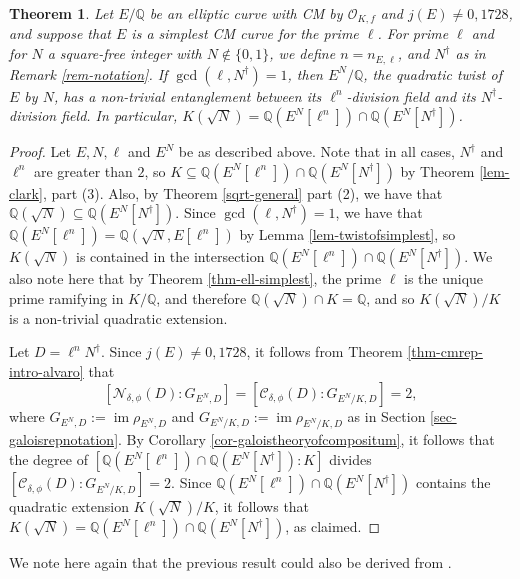 \documentclass[11pt]{amsart}
\newtheorem{theorem}[defn]{Theorem}
\theoremstyle{definition}
\newcommand{\Q}{\mathbb{Q}}
\newcommand{\Of}{\mathcal{O}_{K,f}}
\DeclareMathOperator{\im}{im}  %
\begin{document}
\begin{theorem}
\label{thm-entanglement}
Let $E/\Q$ be an elliptic curve with CM by $\Of$ and $j(E) \neq 0, 1728$, and suppose that $E$ is a simplest CM curve for the prime $\ell$. For prime $\ell$ and for $N$ a square-free integer with $N \notin \{0, 1 \}$, we define $n=n_{E,\ell}$, and $N^{\dagger}$ as in Remark \ref{rem-notation}.
If $\gcd(\ell, N^\dagger) = 1$, then $E^{N}/\Q$, the quadratic twist of $E$ by $N$, has a non-trivial entanglement between its $\ell^n$-division field and its $N^\dagger$-division field. In particular, $K(\sqrt{N}) = \Q(E^{N}[\ell^n]) \cap \Q(E^{N}[N^\dagger])$.

\end{theorem}

\begin{proof}

Let $E, N, \ell$ and $E^N$ be as described above. Note that in all cases, $N^\dagger$ and $\ell^n$ are greater than $2$, so $K \subseteq \Q(E^{N}[\ell^n]) \cap \Q(E^{N}[N^\dagger])$ by Theorem \ref{lem-clark}, part (3). Also, by Theorem \ref{sqrt-general} part (2), we have that $\Q(\sqrt{N}) \subseteq \Q(E^N[N^\dagger])$. Since $\gcd(\ell, N^\dagger) = 1$, we have that $\Q(E^N[\ell^n]) = \Q(\sqrt{N}, E[\ell^n])$ by Lemma \ref{lem-twistofsimplest}, so $K(\sqrt{N})$ is contained in the intersection $\Q(E^{N}[\ell^n]) \cap \Q(E^{N}[N^\dagger])$. We also note here that by Theorem \ref{thm-ell-simplest}, the prime $\ell$ is the unique prime ramifying in $K/\Q$, and therefore $\Q(\sqrt{N})\cap K=\Q$, and so $K(\sqrt{N})/K$ is a non-trivial quadratic extension.

Let $D=\ell^n N^\dagger$. Since $j(E) \neq 0, 1728$, it follows from Theorem \ref{thm-cmrep-intro-alvaro} that \[ [\mathcal{N}_{\delta, \phi}(D) : G_{E^N, D}] = [\mathcal{C}_{\delta, \phi}(D) : G_{E^N/K, D}] = 2,\] where $G_{E^N, D} := \im \rho_{E^N, D}$ and $G_{E^N/K, D} := \im \rho_{E^N/K, D}$ as in Section \ref{sec-galoisrepnotation}. By Corollary \ref{cor-galoistheoryofcompositum}, it follows that the degree of $[\Q(E^N[\ell^n])\cap \Q(E^N[N^\dagger]):K]$ divides $[\mathcal{C}_{\delta, \phi}(D) : G_{E^N/K, D}] = 2$.
Since $\Q(E^N[\ell^n])\cap \Q(E^N[N^\dagger])$ contains the quadratic extension $K(\sqrt{N})/K$, it follows that $K(\sqrt{N}) = \Q(E^{N}[\ell^n]) \cap \Q(E^{N}[N^\dagger])$, as claimed.
\end{proof}

We note here again that the previous result could also be derived from \cite[Theorem 6.3]{CampagnaPengo1}.
\end{document}
